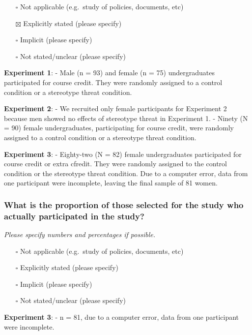 \documentclass[
  doc, a4paper]{apa7}
\providecommand{\tightlist}{%
  \setlength{\itemsep}{0pt}\setlength{\parskip}{0pt}}
\begin{document}
\begin{itemize}
\tightlist
\item[$\square$]
  Not applicable (e.g.~study of policies, documents, etc)
\item[$\boxtimes$]
  Explicitly stated (please specify)
\item[$\square$]
  Implicit (please specify)
\item[$\square$]
  Not stated/unclear (please specify)
\end{itemize}

\textbf{Experiment 1}:
- Male (n = 93) and female (n = 75) undergraduates participated for course credit. They were randomly assigned to a control condition or a stereotype threat condition.

\textbf{Experiment 2}:
- We recruited only female participants for Experiment 2 because men showed no effects of stereotype threat in Experiment 1.
- Ninety (N = 90) female undergraduates, participating for course credit, were randomly assigned to a control condition or a stereotype threat condition.

\textbf{Experiment 3}:
- Eighty-two (N = 82) female undergraduates participated for course credit or extra cfredit. They were randomly assigned to the control condition or the stereotype threat condition. Due to a computer error, data from one participant were incomplete, leaving the final sample of 81 women.

\subsubsection{What is the proportion of those selected for the study who actually participated in the study?}\label{what-is-the-proportion-of-those-selected-for-the-study-who-actually-participated-in-the-study}

\emph{Please specify numbers and percentages if possible.}

\begin{itemize}
\tightlist
\item[$\square$]
  Not applicable (e.g.~study of policies, documents, etc)
\item[$\square$]
  Explicitly stated (please specify)
\item[$\square$]
  Implicit (please specify)
\item[$\square$]
  Not stated/unclear (please specify)
\end{itemize}

\textbf{Experiment 3}:
- n = 81, due to a computer error, data from one participant were incomplete.
\end{document}
